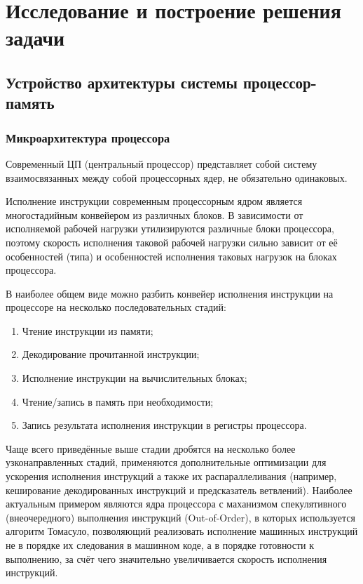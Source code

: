 \section{Исследование и построение решения задачи}
\label{sec:Section3} 

\subsection{Устройство архитектуры системы процессор-память}

\subsubsection{Микроархитектура процессора}

    Современный ЦП (центральный процессор) представляет собой
    систему взаимосвязанных между собой процессорных ядер, не обязательно одинаковых.

    Исполнение инструкции современным процессорным ядром является многостадийным конвейером
    из различных блоков. В зависимости от исполняемой рабочей нагрузки утилизируются различные блоки
    процессора, поэтому скорость исполнения таковой рабочей нагрузки сильно зависит
    от её особенностей (типа) и особенностей исполнения таковых нагрузок на блоках процессора.

    В наиболее общем виде можно разбить конвейер исполнения инструкции на процессоре на несколько
    последовательных стадий:
    \begin{enumerate}
        \item Чтение инструкции из памяти;
        \item Декодирование прочитанной инструкции;
        \item Исполнение инструкции на вычислительных блоках;
        \item Чтение/запись в память при необходимости;
        \item Запись результата исполнения инструкции в регистры процессора.
    \end{enumerate}

    Чаще всего приведённые выше стадии дробятся на несколько более узконаправленных стадий, применяются
    дополнительные оптимизации для ускорения исполнения инструкций а также их распараллеливания
    (например, кеширование декодированных инструкций и предсказатель ветвлений). Наиболее
    актуальным примером являются ядра процессора с маханизмом спекулятивного (внеочередного) выполнения
    инструкций (Out-of-Order), в которых используется алгоритм Томасуло, позволяющий реализовать
    исполнение машинных инструкций не в порядке их следования в машинном коде, а в порядке
    готовности к выполнению, за счёт чего значительно увеличивается скорость исполнения инструкций.

